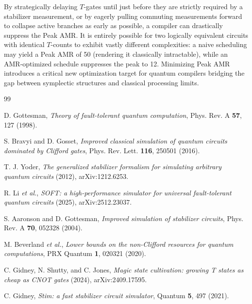 \documentclass[aps,prx,reprint,superscriptaddress,nofootinbib]{revtex4-2}
\theoremstyle{definition}
\begin{document}
By strategically delaying $T$-gates until just before they are strictly required by a stabilizer measurement, or by eagerly pulling commuting measurements forward to collapse active branches as early as possible, a compiler can drastically suppress the Peak AMR. It is entirely possible for two logically equivalent circuits with identical $T$-counts to exhibit vastly different complexities: a naive scheduling may yield a Peak AMR of 50 (rendering it classically intractable), while an AMR-optimized schedule suppresses the peak to 12. Minimizing Peak AMR introduces a critical new optimization target for quantum compilers bridging the gap between symplectic structures and classical processing limits.


\begin{thebibliography}{99}

 D. Gottesman, \textit{Theory of fault-tolerant quantum computation}, Phys. Rev. A \textbf{57}, 127 (1998).

 S. Bravyi and D. Gosset, \textit{Improved classical simulation of quantum circuits dominated by Clifford gates}, Phys. Rev. Lett. \textbf{116}, 250501 (2016).

 T. J. Yoder, \textit{The generalized stabilizer formalism for simulating arbitrary quantum circuits} (2012), arXiv:1212.6253.

 R. Li \textit{et al.}, \textit{SOFT: a high-performance simulator for universal fault-tolerant quantum circuits} (2025), arXiv:2512.23037.

 S. Aaronson and D. Gottesman, \textit{Improved simulation of stabilizer circuits}, Phys. Rev. A \textbf{70}, 052328 (2004).

 M. Beverland \textit{et al.}, \textit{Lower bounds on the non-Clifford resources for quantum computations}, PRX Quantum \textbf{1}, 020321 (2020).

 C. Gidney, N. Shutty, and C. Jones, \textit{Magic state cultivation: growing T states as cheap as CNOT gates} (2024), arXiv:2409.17595.

 C. Gidney, \textit{Stim: a fast stabilizer circuit simulator}, Quantum \textbf{5}, 497 (2021).

\end{thebibliography}
\end{document}
